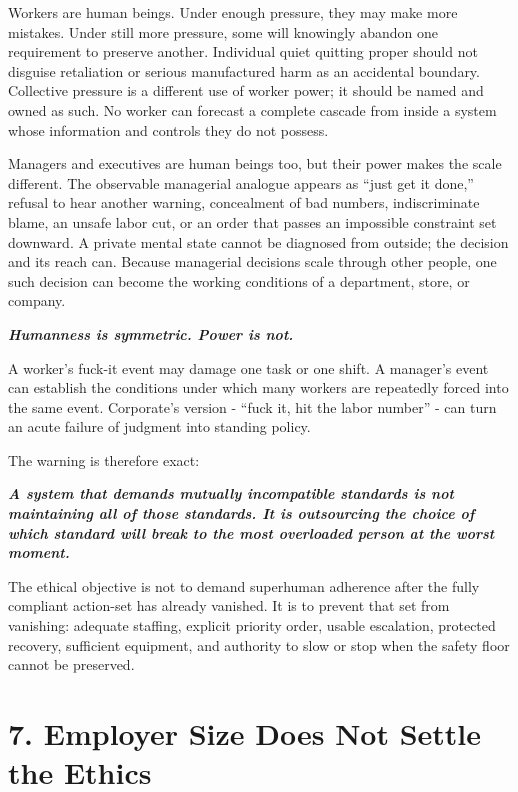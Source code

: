 \documentclass[11pt,oneside]{article}
\renewenvironment{quote}
  {\begin{tcolorbox}[
      enhanced,
      breakable,
      colback=ManifestLight,
      colframe=ManifestRule,
      boxrule=0pt,
      leftrule=3pt,
      arc=0pt,
      outer arc=0pt,
      left=10pt,right=10pt,top=8pt,bottom=8pt,
      before skip=0.8em,after skip=0.8em
    ]\itshape}
  {\end{tcolorbox}}
\begin{document}
Workers are human beings. Under enough pressure, they may make more
mistakes. Under still more pressure, some will knowingly abandon one
requirement to preserve another. Individual quiet quitting proper should
not disguise retaliation or serious manufactured harm as an accidental
boundary. Collective pressure is a different use of worker power; it
should be named and owned as such. No worker can forecast a complete
cascade from inside a system whose information and controls they do not
possess.

Managers and executives are human beings too, but their power makes the
scale different. The observable managerial analogue appears as ``just
get it done,'' refusal to hear another warning, concealment of bad
numbers, indiscriminate blame, an unsafe labor cut, or an order that
passes an impossible constraint set downward. A private mental state
cannot be diagnosed from outside; the decision and its reach can.
Because managerial decisions scale through other people, one such
decision can become the working conditions of a department, store, or
company.

\begin{quote}
\textbf{Humanness is symmetric. Power is not.}
\end{quote}

A worker's fuck-it event may damage one task or one shift. A manager's
event can establish the conditions under which many workers are
repeatedly forced into the same event. Corporate's version - ``fuck it,
hit the labor number'' - can turn an acute failure of judgment into
standing policy.

The warning is therefore exact:

\begin{quote}
\textbf{A system that demands mutually incompatible standards is not
maintaining all of those standards. It is outsourcing the choice of
which standard will break to the most overloaded person at the worst
moment.}
\end{quote}

The ethical objective is not to demand superhuman adherence after the
fully compliant action-set has already vanished. It is to prevent that
set from vanishing: adequate staffing, explicit priority order, usable
escalation, protected recovery, sufficient equipment, and authority to
slow or stop when the safety floor cannot be preserved.

\hypertarget{employer-size-does-not-settle-the-ethics}{%
\section{7. Employer Size Does Not Settle the
Ethics}\label{employer-size-does-not-settle-the-ethics}}
\end{document}
